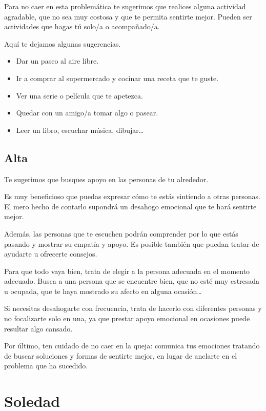             Para no caer en esta problemática te sugerimos que realices alguna actividad agradable, que no sea muy costosa y que te permita sentirte mejor. Pueden ser actividades que hagas tú solo/a o acompañado/a. 
            
            Aquí te dejamos algunas sugerencias. 
            \begin{itemize}
                \item Dar un paseo al aire libre. 
                \item Ir a comprar al supermercado y cocinar una receta que te guste. 
                \item Ver una serie o película que te apetezca.
                \item Quedar con un amigo/a tomar algo o pasear.
                \item Leer un libro, escuchar música, dibujar… 
            \end{itemize}

        \subsection{Alta}
            Te sugerimos que busques apoyo en las personas de tu alrededor.

            Es muy beneficioso que puedas expresar cómo te estás sintiendo a otras personas. El mero hecho de contarlo supondrá un desahogo emocional que te hará sentirte mejor.
            
            Además, las personas que te escuchen podrán comprender por lo que estás pasando y mostrar su empatía y apoyo. Es posible también que puedan tratar de ayudarte u ofrecerte consejos.
            
            Para que todo vaya bien, trata de elegir a la persona adecuada en el momento adecuado. Busca a una persona que se encuentre bien, que no esté muy estresada u ocupada, que te haya mostrado su afecto en alguna ocasión…
            
            Si necesitas desahogarte con frecuencia, trata de hacerlo con diferentes personas y no focalizarte solo en una, ya que prestar apoyo emocional en ocasiones puede resultar algo cansado.
           
            Por último, ten cuidado de no caer en la queja: comunica tus emociones tratando de buscar soluciones y formas de sentirte mejor, en lugar de anclarte en el problema que ha sucedido.

    \section{Soledad}
